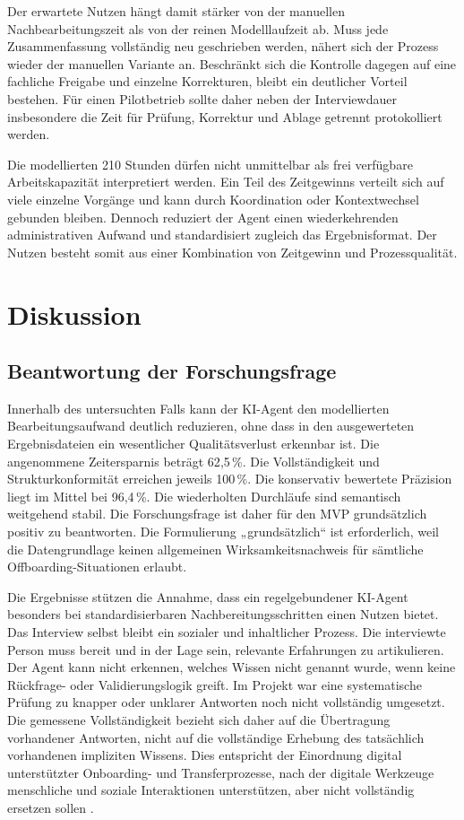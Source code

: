 \documentclass[
  10pt,
  ngerman,
  a4paper,
  toc=graduated,
  numbers=noenddot,
  headings=standardclasses,
  nonumberlist
]{scrartcl}
\newcommand{\pct}[1]{#1\,\%}
\begin{document}
Der erwartete Nutzen hängt damit stärker von der manuellen Nachbearbeitungszeit als von der reinen Modelllaufzeit ab. Muss jede Zusammenfassung vollständig neu geschrieben werden, nähert sich der Prozess wieder der manuellen Variante an. Beschränkt sich die Kontrolle dagegen auf eine fachliche Freigabe und einzelne Korrekturen, bleibt ein deutlicher Vorteil bestehen. Für einen Pilotbetrieb sollte daher neben der Interviewdauer insbesondere die Zeit für Prüfung, Korrektur und Ablage getrennt protokolliert werden.

Die modellierten 210 Stunden dürfen nicht unmittelbar als frei verfügbare Arbeitskapazität interpretiert werden. Ein Teil des Zeitgewinns verteilt sich auf viele einzelne Vorgänge und kann durch Koordination oder Kontextwechsel gebunden bleiben. Dennoch reduziert der Agent einen wiederkehrenden administrativen Aufwand und standardisiert zugleich das Ergebnisformat. Der Nutzen besteht somit aus einer Kombination von Zeitgewinn und Prozessqualität.

\section{Diskussion}

\subsection{Beantwortung der Forschungsfrage}

Innerhalb des untersuchten Falls kann der KI-Agent den modellierten Bearbeitungsaufwand deutlich reduzieren, ohne dass in den ausgewerteten Ergebnisdateien ein wesentlicher Qualitätsverlust erkennbar ist. Die angenommene Zeitersparnis beträgt \pct{62{,}5}. Die Vollständigkeit und Strukturkonformität erreichen jeweils \pct{100}. Die konservativ bewertete Präzision liegt im Mittel bei \pct{96{,}4}. Die wiederholten Durchläufe sind semantisch weitgehend stabil. Die Forschungsfrage ist daher für den MVP grundsätzlich positiv zu beantworten. Die Formulierung „grundsätzlich“ ist erforderlich, weil die Datengrundlage keinen allgemeinen Wirksamkeitsnachweis für sämtliche Offboarding-Situationen erlaubt.

Die Ergebnisse stützen die Annahme, dass ein regelgebundener KI-Agent besonders bei standardisierbaren Nachbereitungsschritten einen Nutzen bietet. Das Interview selbst bleibt ein sozialer und inhaltlicher Prozess. Die interviewte Person muss bereit und in der Lage sein, relevante Erfahrungen zu artikulieren. Der Agent kann nicht erkennen, welches Wissen nicht genannt wurde, wenn keine Rückfrage- oder Validierungslogik greift. Im Projekt war eine systematische Prüfung zu knapper oder unklarer Antworten noch nicht vollständig umgesetzt. Die gemessene Vollständigkeit bezieht sich daher auf die Übertragung vorhandener Antworten, nicht auf die vollständige Erhebung des tatsächlich vorhandenen impliziten Wissens. Dies entspricht der Einordnung digital unterstützter Onboarding- und Transferprozesse, nach der digitale Werkzeuge menschliche und soziale Interaktionen unterstützen, aber nicht vollständig ersetzen sollen \cite[S.~143--145]{sander_onboarding_2023}.
\end{document}
